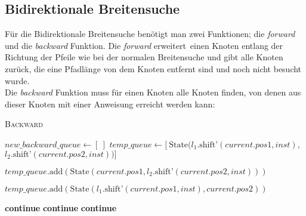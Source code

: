 \documentclass[a4paper,10pt,ngerman]{scrartcl}
\begin{document}
    \subsection{Bidirektionale Breitensuche}
    Für die Bidirektionale Breitensuche benötigt man zwei Funktionen; die \textit{forward} und die \textit{backward} Funktion. Die \textit{forward} \glqq erweitert\grqq~einen Knoten entlang der Richtung der Pfeile wie bei der normalen Breitensuche und gibt alle Knoten zurück, die eine Pfadlänge von dem Knoten entfernt sind und noch nicht besucht wurde. \\
    Die \textit{backward} Funktion muss für einen Knoten alle Knoten finden, von denen aus dieser Knoten mit einer Anweisung erreicht werden kann:
    \begin{algorithm}[H]
        \label{backward}
        \caption{\textsc{Backward}}
        \begin{algorithmic}[1]
                \State $\textit{new\_backward\_queue} \gets [\ ]$
                    \State $\textit{temp\_queue} \gets [\ \text{State}(l_1.\text{shift'}(\textit{current.pos1}, \textit{inst}),$
                    \State \hspace{5em}$l_2.\text{shift'}(\textit{current.pos2}, \textit{inst})) ]$

                        \State $\textit{temp\_queue}.\text{add}(\text{State}(\textit{current.pos1}, l_2.\text{shift'}(\textit{current.pos2}, \textit{inst})))$
                    \EndIf

                        \State $\textit{temp\_queue}.\text{add}(\text{State}(l_1.\text{shift'}(\textit{current.pos1}, \textit{inst}), \textit{current.pos2}))$
                    \EndIf

                            \State \textbf{continue}
                        \EndIf
                            \State \textbf{continue}
                        \EndIf
                            \State \textbf{continue}
                        \EndIf


\end{algorithmic}
\end{algorithm}
\end{document}
